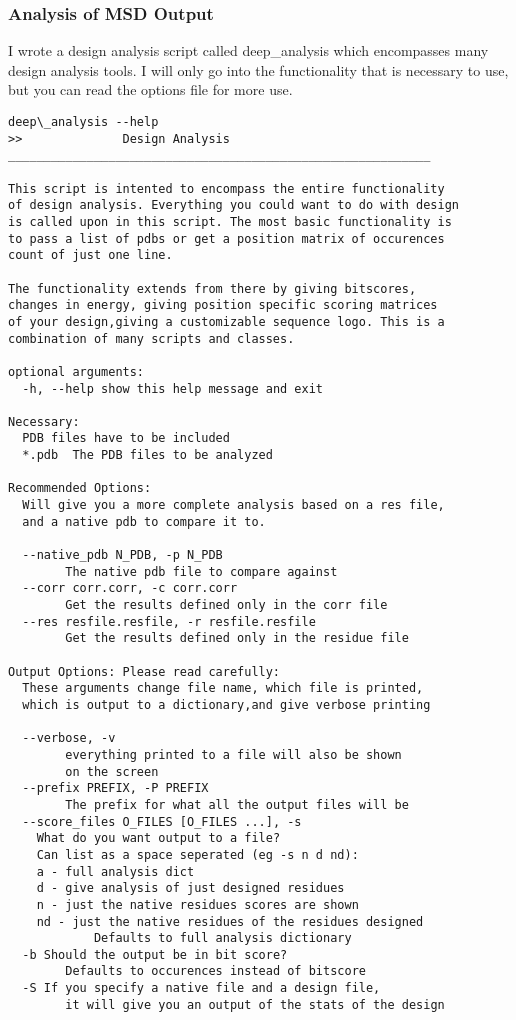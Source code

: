 \subsubsection{Analysis of MSD Output}
I wrote a design analysis script called deep\_analysis which encompasses many design analysis tools. I will only go into the functionality that is necessary to use, but you can read the options file for more use.

\begin{lstlisting}
deep\_analysis --help
>>              Design Analysis
___________________________________________________________

This script is intented to encompass the entire functionality
of design analysis. Everything you could want to do with design
is called upon in this script. The most basic functionality is
to pass a list of pdbs or get a position matrix of occurences
count of just one line.

The functionality extends from there by giving bitscores,
changes in energy, giving position specific scoring matrices
of your design,giving a customizable sequence logo. This is a
combination of many scripts and classes.

optional arguments:
  -h, --help show this help message and exit

Necessary:
  PDB files have to be included
  *.pdb  The PDB files to be analyzed

Recommended Options:
  Will give you a more complete analysis based on a res file,
  and a native pdb to compare it to.

  --native_pdb N_PDB, -p N_PDB
        The native pdb file to compare against
  --corr corr.corr, -c corr.corr
        Get the results defined only in the corr file
  --res resfile.resfile, -r resfile.resfile
        Get the results defined only in the residue file

Output Options: Please read carefully:
  These arguments change file name, which file is printed,
  which is output to a dictionary,and give verbose printing

  --verbose, -v
        everything printed to a file will also be shown
        on the screen
  --prefix PREFIX, -P PREFIX
        The prefix for what all the output files will be
  --score_files O_FILES [O_FILES ...], -s
    What do you want output to a file?
    Can list as a space seperated (eg -s n d nd):
    a - full analysis dict
    d - give analysis of just designed residues
    n - just the native residues scores are shown
    nd - just the native residues of the residues designed
            Defaults to full analysis dictionary
  -b Should the output be in bit score?
        Defaults to occurences instead of bitscore
  -S If you specify a native file and a design file,
        it will give you an output of the stats of the design


\end{lstlisting}
